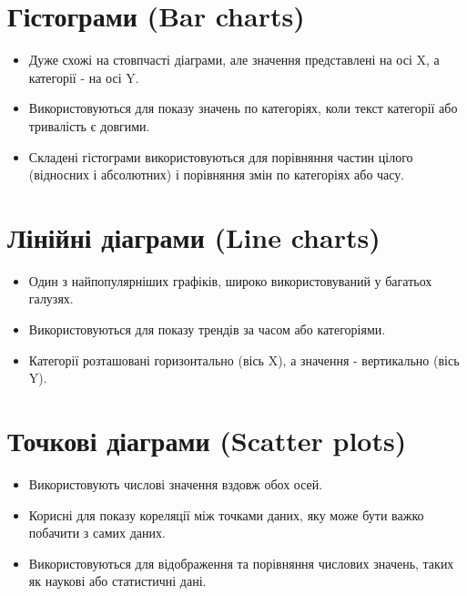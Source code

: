 \documentclass[
  letterpaper,
  DIV=11,
  numbers=noendperiod]{scrreprt}
\providecommand{\tightlist}{%
  \setlength{\itemsep}{0pt}\setlength{\parskip}{0pt}}\usepackage{longtable,booktabs,array}
\begin{document}
\section{Гістограми (Bar
charts)}\label{ux433ux456ux441ux442ux43eux433ux440ux430ux43cux438-bar-charts}

\begin{itemize}
\tightlist
\item
  Дуже схожі на стовпчасті діаграми, але значення представлені на осі X,
  а категорії - на осі Y.
\item
  Використовуються для показу значень по категоріях, коли текст
  категорії або тривалість є довгими.
\item
  Складені гістограми використовуються для порівняння частин цілого
  (відносних і абсолютних) і порівняння змін по категоріях або часу.
\end{itemize}

\section{Лінійні діаграми (Line
charts)}\label{ux43bux456ux43dux456ux439ux43dux456-ux434ux456ux430ux433ux440ux430ux43cux438-line-charts}

\begin{itemize}
\tightlist
\item
  Один з найпопулярніших графіків, широко використовуваний у багатьох
  галузях.
\item
  Використовуються для показу трендів за часом або категоріями.
\item
  Категорії розташовані горизонтально (вісь X), а значення - вертикально
  (вісь Y).
\end{itemize}

\section{Точкові діаграми (Scatter
plots)}\label{ux442ux43eux447ux43aux43eux432ux456-ux434ux456ux430ux433ux440ux430ux43cux438-scatter-plots}

\begin{itemize}
\tightlist
\item
  Використовують числові значення вздовж обох осей.
\item
  Корисні для показу кореляції між точками даних, яку може бути важко
  побачити з самих даних.
\item
  Використовуються для відображення та порівняння числових значень,
  таких як наукові або статистичні дані.
\end{itemize}
\end{document}
